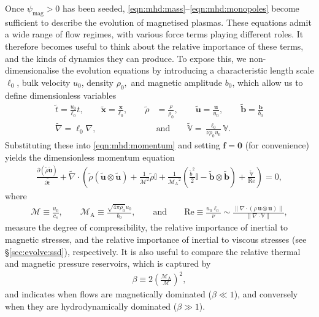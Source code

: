 \documentclass[12pt,twoside]{extreport}
\newcommand{\rbrac}[1]{\left( #1 \right)} %
\newcommand{\rfrac}[2]{\left( \frac{#1}{#2} \right)} %
\newcommand{\mVector}[1]{\bm{#1}} %
\newcommand{\mTensor}[1]{\mathbb{#1}} %
\newcommand{\mpp}[1]{\partial #1}
\newcommand{\mppFrac}[2]{\frac{\mpp{#1}}{\mpp{#2}}}
\newcommand{\mReh}{\ensuremath{\mathrm{Re}}} %
\newcommand{\mSonicMach}{\ensuremath{\mathcal{M}}} %
\newcommand{\mAlfvenMach}{\ensuremath{\mathcal{M}_{\mathrm{A}}}} %
\begin{document}
Once $\psi_\mathrm{mag} > 0$ has been seeded, \autoref{eqn:mhd:mass}--\ref{eqn:mhd:monopoles} become sufficient to describe the evolution of magnetised plasmas. These equations admit a wide range of flow regimes, with various force terms playing different roles. It therefore becomes useful to think about the relative importance of these terms, and the kinds of dynamics they can produce. To expose this, we non-dimensionalise the evolution equations by introducing a characteristic length scale $\ell_0$, bulk velocity $u_0$, density $\rho_0,$ and magnetic amplitude $b_0$, which allow us to define dimensionless variables
\begin{align}
    \tilde{t}
        = \frac{u_0}{\ell_0} t
        , \qquad
    \tilde{\mVector{x}}
        = \frac{\mVector{x}}{\ell_0}
        , \qquad
    \tilde{\rho}
        &= \frac{\rho}{\rho_0}
        , \qquad
    \tilde{\mVector{u}}
        = \frac{\mVector{u}}{u_0}
        , \qquad
    \tilde{\mVector{b}}
        = \frac{\mVector{b}}{b_0}
        \\
    \tilde{\nabla}
        = \ell_0 \nabla
        , \qquad &\mbox{and} \qquad
    \tilde{\mTensor{V}}
        = \frac{\ell_0}{\nu \rho_0 u_0} \mTensor{V}
    .
\end{align}
Substituting these into \autoref{eqn:mhd:momentum} and setting $\mVector{f} = \mVector{0}$ (for convenience) yields the dimensionless momentum equation
\begin{align}
    \mppFrac{(\tilde{\rho} \tilde{\mVector{u}})}{\tilde{t}}
        + \tilde{\nabla} \cdot \rbrac{
            \tilde{\rho} (\tilde{\mVector{u}} \otimes \tilde{\mVector{u}})
            + \frac{1}{\mSonicMach^2} \tilde{\rho} \mTensor{I}
            + \frac{1}{\mAlfvenMach^2} \rbrac{
                \frac{\tilde{b}^2}{2} \mTensor{I}
                - \tilde{\mVector{b}} \otimes \tilde{\mVector{b}}
            }
            + \frac{\tilde{\mTensor{V}}}{\mReh}
        }
        = 0
    ,
\end{align}
where
\begin{align}
    \mSonicMach
        \equiv \frac{u_0}{c_s}
        , \qquad
    \mAlfvenMach
        \equiv \frac{\sqrt{4\pi\rho_0} u_0}{b_0}
        , \qquad \mbox{and} \qquad
    \mReh
        \equiv \frac{u_0\ell_0}{\nu}
        \sim \frac{
            \|\nabla\cdot(\rho\,\mVector{u}\otimes\mVector{u})\|
        }{
            \|\nabla\cdot\mTensor{V}\|
        }
    ,
    \label{defn:Reh}
\end{align}
measure the degree of compressibility, the relative importance of inertial to magnetic stresses, and the relative importance of inertial to viscous stresses (see \S\ref{sec:evolve:ssd}), respectively. It is also useful to compare the relative thermal and magnetic pressure reservoirs, which is captured by
\begin{align}
    \beta
        \equiv 2 \rfrac{\mAlfvenMach}{\mSonicMach}^2
    , \label{defn:plasma-beta}
\end{align}
and indicates when flows are magnetically dominated ($\beta \ll 1$), and conversely when they are hydrodynamically dominated ($\beta \gg 1$).
\end{document}
